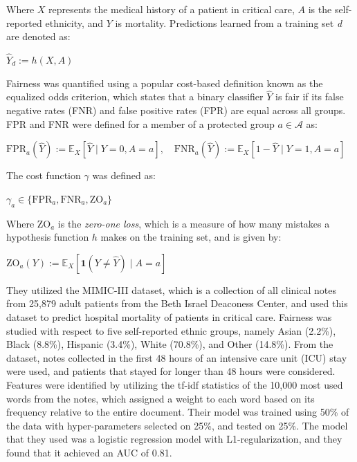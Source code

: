 \documentclass[a4paper]{article}
\begin{document}
Where $X$ represents the medical history of a patient in critical care, $A$ is the self-reported ethnicity, and $Y$ is mortality. Predictions learned from a training set \textit{d} are denoted as:

\begin{center}
    $\hat{Y}_d := h(X,A)$
\end{center}

Fairness was quantified using a popular cost-based definition known as the equalized odds criterion, which states that a binary classifier \textit{$\hat{Y}$} is fair if its false negative rates (FNR) and false positive rates (FPR) are equal across all groups. FPR and FNR were defined for a member of a protected group $a \in \mathcal{A}$ as:

\begin{center}
    $\text{FPR}_a(\hat{Y}) := \mathbb{E}_X[\hat{Y} \mid Y = 0, A = a], \quad \text{FNR}_a(\hat{Y}) := \mathbb{E}_X[1 - \hat{Y} \mid Y = 1, A = a]$
\end{center}

\noindent The cost function $\gamma$ was defined as:

\begin{center}
    $\gamma_a \in \{\text{FPR}_a, \text{FNR}_a, \text{ZO}_a\}$
\end{center}

Where $\text{ZO}_a$ is the \textit{zero-one loss}, which is a measure of how many mistakes a hypothesis function $h$ makes on the training set, and is given by:

\begin{center}
    $\text{ZO}_a(Y) := \mathbb{E}_X[ \mathbf{1}(Y \neq \hat{Y}) \mid A = a]$
\end{center}

They utilized the MIMIC-III dataset, which is a collection of all clinical notes from 25,879 adult patients from the Beth Israel Deaconess Center, and used this dataset to predict hospital mortality of patients in critical care. Fairness was studied with respect to five self-reported ethnic groups, namely Asian (2.2\%), Black (8.8\%), Hispanic (3.4\%), White (70.8\%), and Other (14.8\%). From the dataset, notes collected in the first 48 hours of an intensive care unit (ICU) stay were used, and patients that stayed for longer than 48 hours were considered. Features were identified by utilizing the tf-idf statistics of the 10,000 most used words from the notes, which assigned a weight to each word based on its frequency relative to the entire document. Their model was trained using 50\% of the data with hyper-parameters selected on 25\%, and tested on 25\%. The model that they used was a logistic regression model with L1-regularization, and they found that it achieved an AUC of 0.81.
\end{document}
